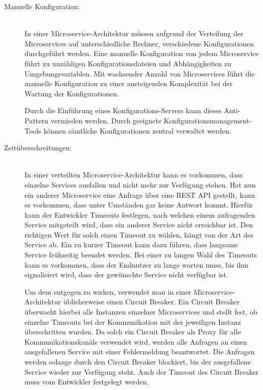 \begin{description}
    \item[Manuelle Konfiguration:]\hfill \\
    In einer Microservice-Architektur müssen aufgrund der Verteilung der Microservices auf unterschiedliche Rechner, verschiedene Konfigurationen durchgeführt werden. Eine manuelle Konfiguration von jedem Microservice führt zu unzähligen Konfigurationsdateien und Abhängigkeiten zu Umgebungsvariablen. Mit wachsender Anzahl von Microservices führt die manuelle Konfiguration zu einer ansteigenden Komplexität bei der Wartung der Konfigurationen.

    Durch die Einführung eines Konfigurations-Servers kann dieses Anti-Pattern vermieden werden. Durch geeignete Konfigurationsmanagement-Tools können sämtliche Konfigurationen zentral verwaltet werden.
    
    \item[Zeitüberschreitungen:]\hfill \\
    In einer verteilten Microservice-Architektur kann es vorkommen, dass einzelne Services ausfallen und nicht mehr zur Verfügung stehen. Hat nun ein anderer Microservice eine Anfrage über eine REST API gestellt, kann es vorkommen, dass unter Umständen gar keine Antwort kommt. Hierfür kann der Entwickler Timeouts festlegen, nach welchen einem anfragenden Service mitgeteilt wird, dass ein anderer Service nicht erreichbar ist. Den richtigen Wert für solch einen Timeout zu wählen, hängt von der Art des Service ab. Ein zu kurzer Timeout kann dazu führen, dass langsame Service frühzeitig beendet werden. Bei einer zu langen Wahl des Timeouts kann es vorkommen, dass der Endnutzer zu lange warten muss, bis ihm signalisiert wird, dass der gewünschte Service nicht verfügbar ist.

    Um dem entgegen zu wirken, verwendet man in einer Microservice-Architektur üblicherweise einen Circuit Breaker. Ein Circuit Breaker überwacht hierbei alle Instanzen einzelner Microservices und stellt fest, ob einzelne Timeouts bei der Kommunikation mit der jeweiligen Instanz überschritten wurden. Da solch ein Circuit Breaker als Proxy für alle Kommunikationskanäle verwendet wird, werden alle Anfragen an einen ausgefallenen Service mit einer Fehlermeldung beantwortet. Die Anfragen werden solange durch den Circuit Breaker blockiert, bis der ausgefallene Service wieder zur Verfügung steht. Auch der Timeout des Circuit Breaker muss vom Entwickler festgelegt werden.

\end{description}

